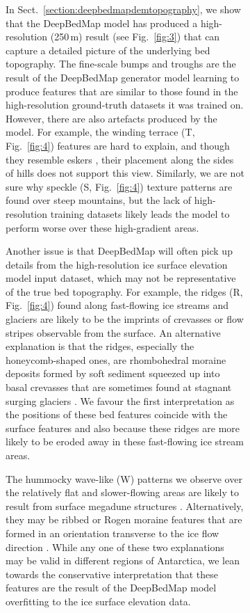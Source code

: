 \documentclass[tc, noline]{copernicus}
\begin{document}
\begin{figure}[t]
\begin{figure}[t]
In Sect.~\ref{section:deepbedmapdemtopography}, we show that the DeepBedMap model has produced a high-resolution (250\,\unit{m}) result (see Fig.~\ref{fig:3}) that can capture a detailed picture of the underlying bed topography.
The fine-scale bumps and troughs are the result of the DeepBedMap generator model learning to produce features that are similar to those found in the high-resolution ground-truth datasets it was trained on.
However, there are also artefacts produced by the model.
For example, the winding terrace (T, Fig.~\ref{fig:4}) features are hard to explain, and though they resemble eskers \citep{DrewsActivelyevolvingsubglacial2017}, their placement along the sides of hills does not support this view.
Similarly, we are not sure why speckle (S, Fig.~\ref{fig:4}) texture patterns are found over steep mountains, but the lack of high-resolution training datasets likely leads the model to perform worse over these high-gradient areas.

Another issue is that DeepBedMap will often pick up details from the high-resolution ice surface elevation model \citep{HowatReferenceElevationModel2019} input dataset, which may not be representative of the true bed topography.
For example, the ridges (R, Fig.~\ref{fig:4}) found along fast-flowing ice streams and glaciers are likely to be the imprints of crevasses or flow stripes \citep{GlasserLongitudinalsurfacestructures2012} observable from the surface.
An alternative explanation is that the ridges, especially the honeycomb-shaped ones, are rhombohedral moraine deposits formed by soft sediment squeezed up into basal crevasses that are sometimes found at stagnant surging glaciers \citep{Dowdeswellvarietydistributionsubmarine2016,DowdeswellRhombohedralcrevassefillridges2016,SolheimSeafloormorphologyoutside1985}.
We favour the first interpretation as the positions of these bed features coincide with the surface features and also because these ridges are more likely to be eroded away in these fast-flowing ice stream areas.

\hack{\newpage}

The hummocky wave-like (W) patterns we observe over the relatively flat and slower-flowing areas are likely to result from surface megadune structures \citep{ScambosSnowMegadune2014}.
Alternatively, they may be ribbed or Rogen moraine features that are formed in an orientation transverse to the ice flow direction \citep{HattestrandRibbedmorainesSweden1997,HattestrandRibbedmoraineformation1999}.
While any one of these two explanations may be valid in different regions of Antarctica, we lean towards the conservative interpretation that these features are the result of the DeepBedMap model overfitting to the ice surface elevation data.


\end{figure}
\end{figure}
\end{document}
